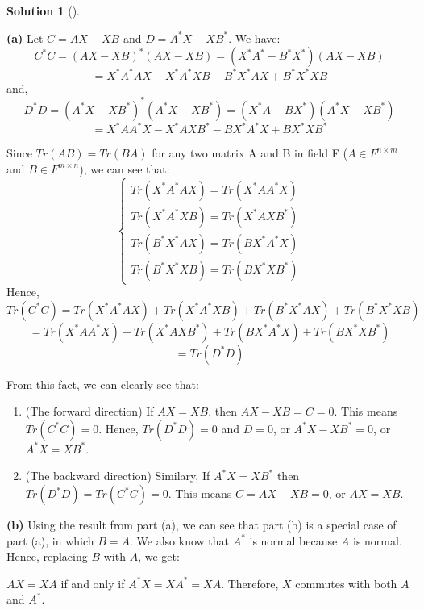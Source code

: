 \documentclass[numbers=enddot,12pt,final,onecolumn,notitlepage]{scrartcl}
\newcounter{sol}
\theoremstyle{definition}
\newtheorem{solu}[sol]{Solution}
\newenvironment{solution}[1][]
{\begin{solu}[#1]\begin{leftbar}}
        {\end{leftbar}\end{solu}}
\begin{document}
\begin{solution}
	\textbf{(a)} Let $C = AX - XB$ and $D = A^{\ast}X - XB^{\ast}$. We have:
	\[
		C^{\ast}C = (AX - XB)^{\ast}(AX - XB) = (X^{\ast}A^{\ast} - B^{\ast}X^{\ast})(AX - XB)
	\]
	\[
		= X^{\ast}A^{\ast}AX - X^{\ast}A^{\ast}XB - B^{\ast}X^{\ast}AX + B^{\ast}X^{\ast}XB
	\]
	and,
	\[
		D^{\ast}D = (A^{\ast}X - XB^{\ast})^{\ast}(A^{\ast}X - XB^{\ast}) = (X^{\ast}A - BX^{\ast})(A^{\ast}X - XB^{\ast})
	\]
	\[
		= X^{\ast}AA^{\ast}X - X^{\ast}AXB^{\ast} - BX^{\ast}A^{\ast}X + BX^{\ast}XB^{\ast}
	\]

	Since $Tr(AB) = Tr(BA)$ for any two matrix A and B in field F ($A \in F^{n \times m}$ and $B \in F^{m \times n}$), we can see that:
	\[
		\begin{cases}
			Tr(X^{\ast}A^{\ast}AX) = Tr(X^{\ast}AA^{\ast}X) \\
			Tr(X^{\ast}A^{\ast}XB) = Tr(X^{\ast}AXB^{\ast}) \\
			Tr(B^{\ast}X^{\ast}AX) = Tr(BX^{\ast}A^{\ast}X) \\
			Tr(B^{\ast}X^{\ast}XB) = Tr(BX^{\ast}XB^{\ast})
		\end{cases}
	\]
	Hence,
	\[
		Tr(C^{\ast}C) = Tr(X^{\ast}A^{\ast}AX) + Tr(X^{\ast}A^{\ast}XB) + Tr(B^{\ast}X^{\ast}AX) + Tr(B^{\ast}X^{\ast}XB)
	\]
	\[
		= Tr(X^{\ast}AA^{\ast}X) + Tr(X^{\ast}AXB^{\ast}) + Tr(BX^{\ast}A^{\ast}X) + Tr(BX^{\ast}XB^{\ast})
	\]
	\[
		= Tr(D^{\ast}D)
	\]

	From this fact, we can clearly see that:
	\begin{enumerate}
		\item (The forward direction) If $AX = XB$, then $AX - XB = C = 0$. This means $Tr(C^{\ast}C) = 0$. Hence, $Tr(D^{\ast}D) = 0$ and $D = 0$, or $A^{\ast}X - XB^{\ast} = 0$, or $A^{\ast}X = XB^{\ast}$.
		\item (The backward direction) Similary, If $A^{\ast}X = XB^{\ast}$ then $Tr(D^{\ast}D) = Tr(C^{\ast}C) = 0$. This means $C = AX - XB = 0$, or $AX = XB$.
	\end{enumerate}

	\textbf{(b)} Using the result from part (a), we can see that part (b) is a special case of part (a), in which $B = A$. We also know that $A^{\ast}$ is normal because $A$ is normal. Hence, replacing $B$ with $A$, we get:

	$AX = XA$ if and only if $A^{\ast}X = XA^{\ast} = XA$. Therefore, $X$ commutes with both $A$ and $A^{\ast}$.

\end{solution}
\end{document}
